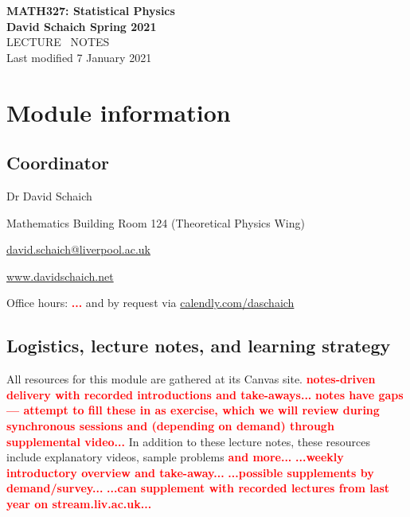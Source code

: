 \documentclass[12 pt]{article}
\newcommand{\TODO}[1]{\textcolor{red}{\textbf{#1}}}
\begin{document}
\begin{center}
  {\LARGE \textbf{MATH327: Statistical Physics}} \\[6 pt]
  \textbf{David Schaich \qquad\qquad\qquad\qquad Spring 2021} \\[48 pt]
  {\LARGE LECTURE \ NOTES} \\[6 pt]
  Last modified 7 January 2021
\end{center}
\renewcommand{\contentsname}{}
\setcounter{tocdepth}{1}
\tableofcontents



\newpage
\setcounter{section}{0}
\section*{Module information}
\subsection*{Coordinator}
\begin{description}
  \setlength{\itemsep}{1pt}
  \setlength{\parskip}{0pt}
  \setlength{\parsep}{0pt}
  \item[\qquad] Dr David Schaich
  \item[\qquad] Mathematics Building Room 124 (Theoretical Physics Wing)
  \item[\qquad] \href{mailto:david.schaich@liverpool.ac.uk}{david.schaich@liverpool.ac.uk}
  \item[\qquad] \href{http://www.davidschaich.net}{www.davidschaich.net} \\
  \item[\qquad] Office hours: \TODO{...} and by request via \href{https://calendly.com/daschaich}{calendly.com/daschaich}
\end{description}



\subsection*{Logistics, lecture notes, and learning strategy}
All resources for this module are gathered at its Canvas site.
\TODO{notes-driven delivery with recorded introductions and take-aways...}
\TODO{notes have gaps --- attempt to fill these in as exercise, which we will review during synchronous sessions and (depending on demand) through supplemental video...}
In addition to these lecture notes, these resources include explanatory videos, sample problems \TODO{and more...}
\TODO{...weekly introductory overview and take-away...}
\TODO{...possible supplements by demand/survey...} %
\TODO{...can supplement with recorded lectures from last year on stream.liv.ac.uk...}
\end{document}
